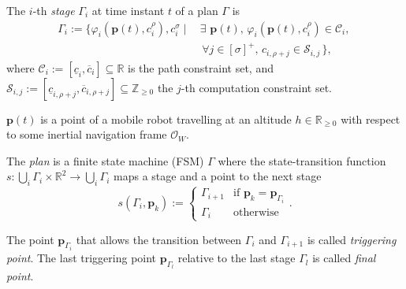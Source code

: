 \begin{highlight}  
  \begin{defn}[Stage]\label{def:mission}
    The $i$-th \emph{stage} $\Gamma_i$ at time instant $t$ of a plan $\Gamma$ is
    \begin{equation*}\begin{split}
      \Gamma_i:=\{\varphi_i(\mathbf{p}(t),c_i^\rho),c_i^\sigma\mid
      \,&\exists\,\,\mathbf{p}(t),\,\varphi_i(\mathbf{p}(t),c_i^\rho)\in\mathcal{C}_i,\,\\
        &\,\forall j\in[\sigma]^+,\,c_{i,\rho+j}\in\mathcal{S}_{i,j}\,\},
    \end{split}\end{equation*}
    where $\mathcal{C}_i:=[\underline{c}_i,\overline{c}_i]\subseteq\mathbb{R}$ is the path constraint set, and $\mathcal{S}_{i,j}:=[\underline{c}_{i,\rho+j},\overline{c}_{i,\rho+j}]\subseteq\mathbb{Z}_{\geq 0}$ the $j$-th computation constraint set. 
    
    $\mathbf{p}(t)$ is a point of a mobile robot travelling at an altitude $h\in\mathbb{R}_{\geq 0}$ with respect to some inertial navigation frame $\mathcal{O}_W$.
  \end{defn}
\end{highlight}

\begin{highlight}  
  \begin{defn}[Plan]
    The \emph{plan} is a finite state machine (FSM) $\Gamma$ where the state-transition function $s:\bigcup_i{\Gamma_i}\times\mathbb{R}^2\rightarrow\bigcup_i{\Gamma_i}$ maps a stage and a point to the next stage
    \begin{equation*}s(\Gamma_i,\mathbf{p}_k):=\begin{cases}
      \Gamma_{i+1} & \text{if }\mathbf{p}_k=\mathbf{p}_{\Gamma_i}\\
      \Gamma_i & \text{otherwise}
    \end{cases}.\end{equation*}
  \end{defn}
\end{highlight}

\begin{highlight}  
  \begin{defn}\label{def:mission}
    The point $\mathbf{p}_{\Gamma_{i}}$ that allows the transition between $\Gamma_i$ and $\Gamma_{i+1}$ is called \emph{triggering point}. The last triggering point $\mathbf{p}_{\Gamma_{l}}$ relative to the last stage $\Gamma_l$ is called \emph{final point}.
  \end{defn}
\end{highlight}

